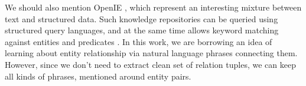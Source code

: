 We should also mention OpenIE \cite{fader2011identifying}, which represent an interesting mixture between text and structured data.
Such knowledge repositories can be queried using structured query languages, and at the same time allows keyword matching against entities and predicates \cite{Fader:2014:OQA:2623330.2623677}.
In this work, we are borrowing an idea of learning about entity relationship via natural language phrases connecting them.
However, since we don't need to extract clean set of relation tuples, we can keep all kinds of phrases, mentioned around entity pairs.